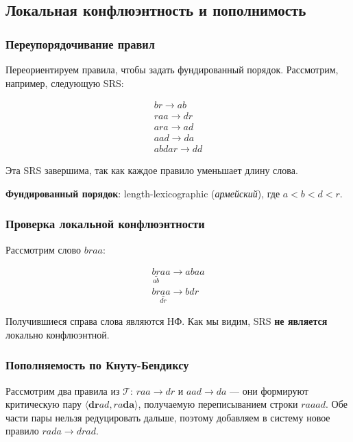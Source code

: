 \documentclass[a4paper, 12pt]{article}
\newcommand{\T}{\mathcal{T}}
\begin{document}
    \subsection{Локальная конфлюэнтность и пополнимость}

    \subsubsection{Переупорядочивание правил}

    Переориентируем правила, чтобы задать фундированный порядок. Рассмотрим, например, следующую SRS:

    \begin{gather*}
    br    \to ab\\
    raa   \to dr\\
    ara   \to ad\\
    aad   \to da\\
    abdar \to dd
    \end{gather*}

    Эта SRS завершима, так как каждое правило уменьшает длину слова.
    
    \textbf{Фундированный порядок}: length-lexicographic (\textit{армейский}), где $a < b < d < r$.

    \subsubsection{Проверка локальной конфлюэнтности}

    Рассмотрим слово $braa$:

    \begin{gather*}
        \underset{ab}{\underline{br}} aa \to abaa\\
        b\underset{dr}{\underline{raa}} \to bdr
    \end{gather*}

    Получившиеся справа слова являются НФ. Как мы видим, SRS \textbf{не является} локально конфлюэнтной.

    \subsubsection{Пополняемость по Кнуту-Бендиксу}

    Рассмотрим два правила из $\T$: $raa \to dr$ и $aad \to da$ --- они формируют критическую пару $\langle \mathbf{dr}ad, ra\mathbf{da} \rangle$, получаемую переписыванием строки $raaad$. Обе части пары нельзя редуцировать дальше, поэтому добавляем в систему новое правило $rada \to drad$.
\end{document}
